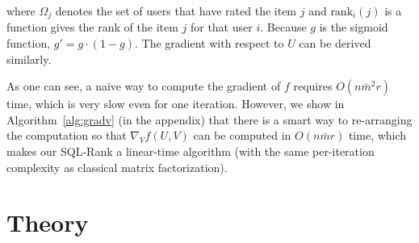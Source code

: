\documentclass{article}
\begin{document}
where $\Omega_j$ denotes the set of users that have rated the item $j$ and $\text{rank}_i(j)$ is a function gives the rank of the item $j$ for that user $i$. Because $g$ is the sigmoid function, $g' = g \cdot (1 - g)$. 
The gradient with respect to $U$ can be derived similarly. 

As one can see, a naive way to compute the gradient of $f$ requires  $O(n \bar{m}^2 r)$ time, which is very slow even for one iteration. However, 
we show in Algorithm~\ref{alg:gradv} (in the appendix) that there is a smart way to re-arranging the computation so that $\nabla_V f(U, V)$ can be computed in $O(n \bar{m} r)$
time, which makes our SQL-Rank a linear-time algorithm (with the same per-iteration complexity as classical matrix factorization). 




\section{Theory}
\label{theory}
\end{document}
